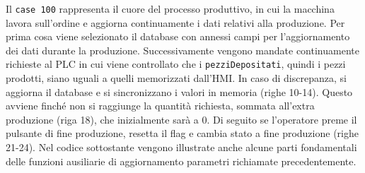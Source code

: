 Il \verb|case 100| rappresenta il cuore del processo produttivo, in cui la macchina lavora sull'ordine e aggiorna continuamente i dati relativi alla produzione. Per prima cosa viene selezionato il database con annessi campi per l'aggiornamento dei dati durante la produzione. Successivamente vengono mandate continuamente richieste al PLC in cui viene controllato che i \verb|pezziDepositati|, quindi i pezzi prodotti, siano uguali a quelli memorizzati dall'HMI. In caso di discrepanza, si aggiorna il database e si sincronizzano i valori in memoria (righe 10-14). Questo avviene finché non si raggiunge la quantità richiesta, sommata all'extra produzione (riga 18), che inizialmente sarà a 0. Di seguito se l'operatore preme il pulsante di fine produzione, resetta il flag e cambia stato a fine produzione (righe 21-24). Nel codice sottostante vengono illustrate anche alcune parti fondamentali delle funzioni ausiliarie di aggiornamento parametri richiamate precedentemente.
